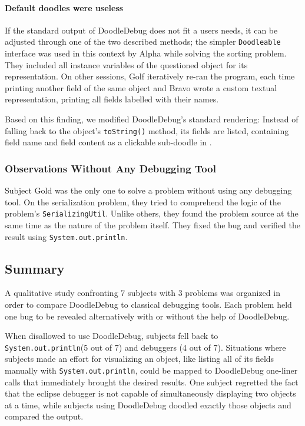 \documentclass[english]{scrartcl}
\newcommand\nes[1]{\nbc{nes}{#1}{blue}}
\newcommand{\DD}{Dood\-le\-De\-bug\xspace}
\newcommand{\println}{\texttt{Sys\-tem.\-out.\-println}\xspace}
\begin{document}
\paragraph{Default doodles were useless}
If the standard output of DoodleDebug does not fit a users \nes{grammar.} needs, it can be adjusted through one of the two described methods; the simpler \texttt{Doodleable} interface was used in this context by Alpha while solving the sorting problem.
They included all instance variables of the questioned object for its representation.
On other sessions, Golf iteratively re-ran the program, each time printing another field of the same object and Bravo wrote a custom textual representation, printing all fields labelled with their names.

Based on this finding, we modified DoodleDebug's standard rendering: Instead of falling back to the object's \texttt{toString()} method, its fields are listed, containing field name and field content as a clickable sub-doodle in .

\subsubsection{Observations Without Any Debugging Tool}
Subject Gold was the only one to solve a problem without using any debugging tool.
On the serialization problem, they tried to comprehend the logic of the problem's \texttt{SerializingUtil}.
Unlike others, they found the problem source at the same time as the nature of the problem itself.
They fixed the bug and verified the result using \println.

\subsection{Summary}
A qualitative study confronting 7 subjects with 3 problems was organized in order to compare \DD to classical debugging tools.
Each problem held one bug to be revealed alternatively with or without the help of \DD.

When disallowed to use \DD, subjects fell back to \println (5 out of 7) and debuggers (4 out of 7).
Situations where subjects made an effort for visualizing an object, like listing all of its fields manually with \println, could be mapped to \DD one-liner calls that immediately brought the desired results.
One subject regretted the fact that the eclipse debugger is not capable of simultaneously displaying two objects at a time, while subjects using \DD doodled exactly those objects and compared the output.
\end{document}
